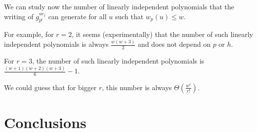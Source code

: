 \documentclass[12pt,a4paper,titlepage]{article}
\begin{document}
We can study now the number of linearly independent polynomials that the writing of $g_{p^r}^{uc_j}$ can generate for all $u$ such that $w_p(u) \leq w$.

For example, for $r = 2$, it seems (experimentally) that the number of such linearly independent polynomials is always $\frac{w(w+3)}{2}$ and does not depend on $p$ or $h$.

For $r = 3$, the number of such linearly independent polynomials is $\frac{(w+1)(w+2)(w+3)}{6}-1$.

We could guess that for bigger $r$, this number is always $\Theta\left(\frac{w^r}{r!}\right)$.
\section{Conclusions}






\newpage
\appendix
\end{document}
